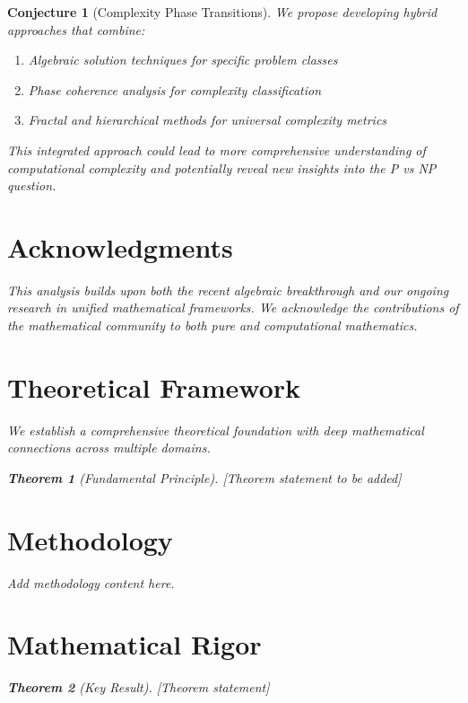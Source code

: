 \documentclass[12pt]{article}
\newtheorem{theorem}{Theorem}
\newtheorem{conjecture}{Conjecture}
\begin{document}
\begin{conjecture}[Complexity Phase Transitions]
We propose developing hybrid approaches that combine:
\begin{enumerate}
    \item Algebraic solution techniques for specific problem classes
    \item Phase coherence analysis for complexity classification
    \item Fractal and hierarchical methods for universal complexity metrics
\end{enumerate}

This integrated approach could lead to more comprehensive understanding of computational complexity and potentially reveal new insights into the P vs NP question.

\section{Acknowledgments}

This analysis builds upon both the recent algebraic breakthrough and our ongoing research in unified mathematical frameworks. We acknowledge the contributions of the mathematical community to both pure and computational mathematics.






\section{Theoretical Framework}

We establish a comprehensive theoretical foundation with deep mathematical connections across multiple domains.

\begin{theorem}[Fundamental Principle]
[Theorem statement to be added]
\end{theorem}

\section{Methodology}
\label{sec:methodology}

Add methodology content here.



\section{Mathematical Rigor}

\begin{theorem}[Key Result]
[Theorem statement]
\end{theorem}


\end{conjecture}
\end{document}
